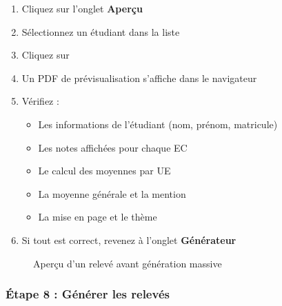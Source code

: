 \begin{enumerate}[leftmargin=*]
    \item Cliquez sur l'onglet \textbf{Aperçu}
    \item Sélectionnez un étudiant dans la liste
    \item Cliquez sur 
    \item Un PDF de prévisualisation s'affiche dans le navigateur
    \item Vérifiez :
    \begin{itemize}
        \item Les informations de l'étudiant (nom, prénom, matricule)
        \item Les notes affichées pour chaque EC
        \item Le calcul des moyennes par UE
        \item La moyenne générale et la mention
        \item La mise en page et le thème
    \end{itemize}
    \item Si tout est correct, revenez à l'onglet \textbf{Générateur}
\end{enumerate}

\begin{figure}[h]
    \centering
    \caption{Aperçu d'un relevé avant génération massive}
\end{figure}

\subsubsection{Étape 8 : Générer les relevés}

